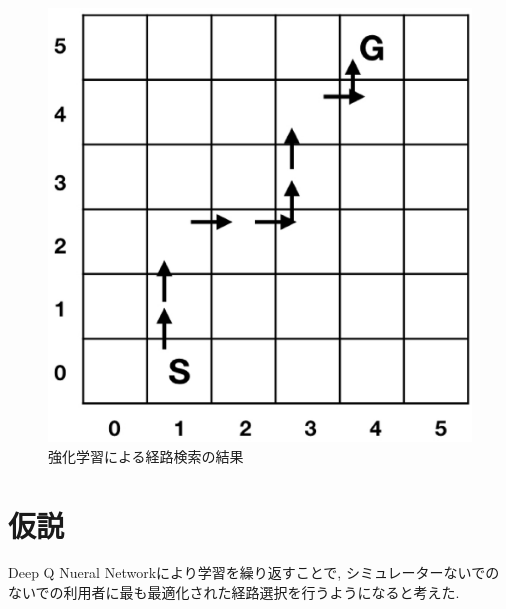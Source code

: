 \begin{figure}[H]
    \centering  %
    \includegraphics[clip,width = 13.0cm]{assets/rein_simple.eps}
    \caption{強化学習による経路検索の結果}  \label{sample}
  \end{figure}
  





\section{仮説}

Deep Q Nueral Networkにより学習を繰り返すことで, シミュレーターないでのないでの利用者に最も最適化された経路選択を行うようになると考えた.


